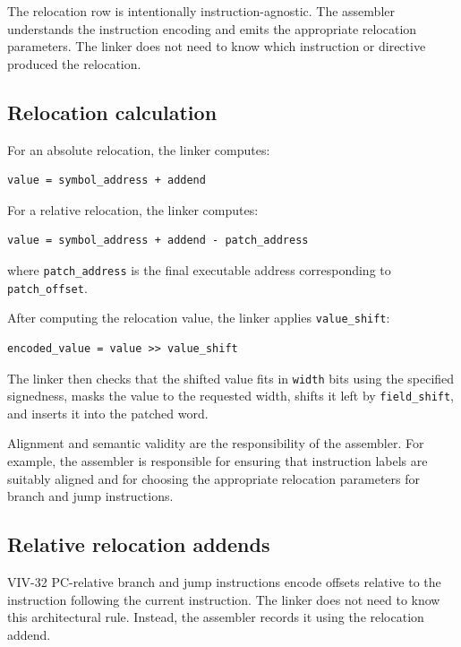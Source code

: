 The relocation row is intentionally instruction-agnostic. The assembler understands
the instruction encoding and emits the appropriate relocation parameters. The linker
does not need to know which instruction or directive produced the relocation.

\subsection{Relocation calculation}

For an absolute relocation, the linker computes:

\begin{verbatim}
value = symbol_address + addend
\end{verbatim}

For a relative relocation, the linker computes:

\begin{verbatim}
value = symbol_address + addend - patch_address
\end{verbatim}

where \texttt{patch\_address} is the final executable address corresponding to
\texttt{patch\_offset}.

After computing the relocation value, the linker applies \texttt{value\_shift}:

\begin{verbatim}
encoded_value = value >> value_shift
\end{verbatim}

The linker then checks that the shifted value fits in \texttt{width} bits using the
specified signedness, masks the value to the requested width, shifts it left by
\texttt{field\_shift}, and inserts it into the patched word.

Alignment and semantic validity are the responsibility of the assembler. For example,
the assembler is responsible for ensuring that instruction labels are suitably aligned
and for choosing the appropriate relocation parameters for branch and jump
instructions.

\subsection{Relative relocation addends}

VIV-32 PC-relative branch and jump instructions encode offsets relative to the
instruction following the current instruction. The linker does not need to know this
architectural rule. Instead, the assembler records it using the relocation addend.

